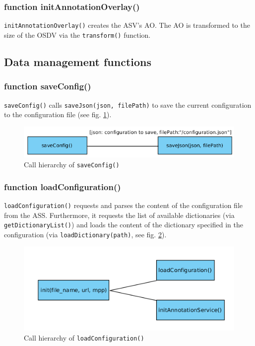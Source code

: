 \subsubsection{function initAnnotationOverlay()}
\texttt{initAnnotationOverlay()} creates the ASV's AO. The AO is transformed to the size of the OSDV via the \texttt{transform()} function.


\subsection{Data management functions}

\subsubsection{function saveConfig()}
\texttt{saveConfig()} calls \texttt{saveJson(json, filePath)} to save the current configuration to the configuration file (see fig. \ref{figB_saveConfig}).

\begin{figure}[H]
	\begin{center}
		\includegraphics[scale=0.5]{img/ch_saveConfig.png}
		\caption{Call hierarchy of \texttt{saveConfig()}}
		\label{figB_saveConfig}
	\end{center}
\end{figure}


\subsubsection{function loadConfiguration()}
\texttt{loadConfiguration()} requests and parses the content of the configuration file from the ASS. Furthermore, it requests the list of available dictionaries (via \texttt{getDictionaryList()}) and loads the content of the dictionary specified in the configuration (via \texttt{loadDictionary(path)}, see fig. \ref{figB_loadConfig}).

\begin{figure}[H]
	\begin{center}
		\includegraphics[scale=0.5]{img/ch_init.png}
		\caption{Call hierarchy of \texttt{loadConfiguration()}}
		\label{figB_loadConfig}
	\end{center}
\end{figure}


